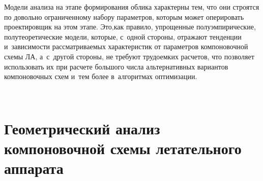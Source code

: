 \begin{multicols}{2}
  Модели анализа на этапе формирования облика характерны тем, что они 
строятся по довольно ограниченному набору параметров, которым  может 
оперировать проектировщик на этом этапе. Это,\linebreak как правило, упрощенные 
полуэмпирические, \mbox{полутеоретические} модели, которые, с~одной стороны, 
отражают тенденции и~за\-ви\-си\-мости рас\-смат\-ри\-ва\-емых характеристик от 
па\-ра\-мет\-ров компоновочной схемы ЛА, а~с~другой стороны, не требуют 
тру\-до\-емких расчетов, что поз\-во\-ля\-ет использовать их при расчете большого 
чис\-ла альтернативных вариантов компоновочных схем и~тем более 
в~алгоритмах оптимизации. 

\begin{figure*} %
\vspace*{1pt}
  \begin{center}  
    \mbox{%
\epsfxsize=160mm 
}
\end{center}
\vspace*{-9pt}
\end{figure*}


\section{Геометрический анализ компоновочной схемы летательного аппарата}




\end{multicols}
